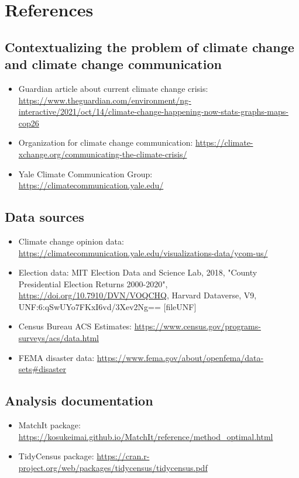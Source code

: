\documentclass{article}
\begin{document}
\newpage
\section{References}

\subsection{Contextualizing the problem of climate change and climate change communication}
\begin{itemize}
	\item Guardian article about current climate change crisis: \url{https://www.theguardian.com/environment/ng-interactive/2021/oct/14/climate-change-happening-now-stats-graphs-maps-cop26}
	\item Organization for climate change communication: \url{https://climate-xchange.org/communicating-the-climate-crisis/}
	\item Yale Climate Communication Group: \url{https://climatecommunication.yale.edu/}
\end{itemize}

\subsection{Data sources}
\begin{itemize}
	\item Climate change opinion data: \url{https://climatecommunication.yale.edu/visualizations-data/ycom-us/}
	\item Election data: MIT Election Data and Science Lab, 2018, "County Presidential Election Returns 2000-2020", \url{https://doi.org/10.7910/DVN/VOQCHQ}, Harvard Dataverse, V9, UNF:6:qSwUYo7FKxI6vd/3Xev2Ng== [fileUNF]
	\item Census Bureau ACS Estimates: \url{https://www.census.gov/programs-surveys/acs/data.html}
	\item FEMA disaster data: \url{https://www.fema.gov/about/openfema/data-sets#disaster}
\end{itemize}

\subsection{Analysis documentation}
\begin{itemize}
	\item MatchIt package: \url{https://kosukeimai.github.io/MatchIt/reference/method_optimal.html}
	\item TidyCensus package: \url{https://cran.r-project.org/web/packages/tidycensus/tidycensus.pdf}
\end{itemize}
\end{document}
